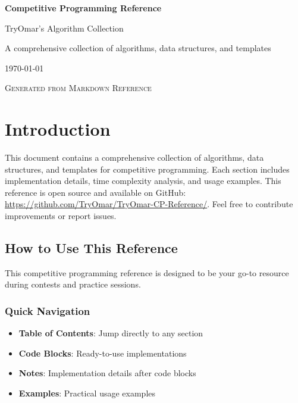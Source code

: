 \documentclass[11pt,a4paper]{article}
\begin{document}
\begin{titlepage}
    \centering
    \vspace*{2cm}
    
    {\Huge\bfseries Competitive Programming Reference\par}
    \vspace{1cm}
    
    {\Large TryOmar's Algorithm Collection\par}
    \vspace{2cm}
    
    {\large A comprehensive collection of algorithms, data structures, and templates\par}
    \vspace{1cm}
    
    {\large \today\par}
    
    \vfill
    
    {\large \textsc{Generated from Markdown Reference}\par}
\end{titlepage}

\tableofcontents
\newpage

\section{Introduction}
This document contains a comprehensive collection of algorithms, data structures, and templates for competitive programming. Each section includes implementation details, time complexity analysis, and usage examples. This reference is open source and available on GitHub: \url{https://github.com/TryOmar/TryOmar-CP-Reference/}. Feel free to contribute improvements or report issues.

\subsection{How to Use This Reference}

This competitive programming reference is designed to be your go-to resource during contests and practice sessions.

\subsubsection*{Quick Navigation}
\begin{itemize}
\item \textbf{Table of Contents}: Jump directly to any section
\item \textbf{Code Blocks}: Ready-to-use implementations
\item \textbf{Notes}: Implementation details after code blocks
\item \textbf{Examples}: Practical usage examples
\end{itemize}
\end{document}
